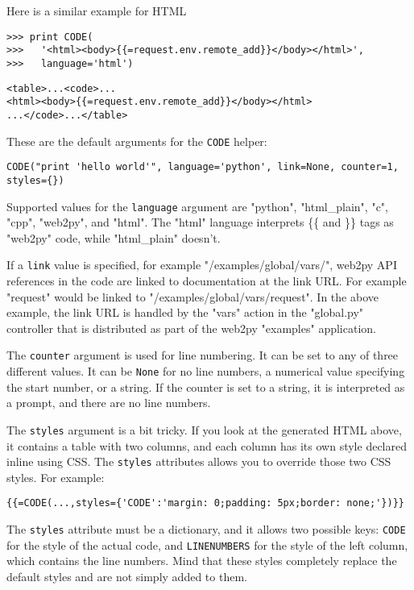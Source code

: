 \documentclass[justified,sixbynine,notoc]{tufte-book}
\def\ft{\small\tt}
\begin{document}
\begin{fullwidth}
Here is a similar example for HTML
\begin{lstlisting}
>>> print CODE(
>>>   '<html><body>{{=request.env.remote_add}}</body></html>',
>>>   language='html')
\end{lstlisting}
\begin{lstlisting}[keywords={}]
<table>...<code>...
<html><body>{{=request.env.remote_add}}</body></html>
...</code>...</table>
\end{lstlisting}

These are the default arguments for the {\ft CODE} helper:
\begin{lstlisting}
CODE("print 'hello world'", language='python', link=None, counter=1, styles={})
\end{lstlisting}

Supported values for the {\ft language} argument are "python", "html\_plain", "c", "cpp", "web2py", and "html". The "html" language interprets \{\{ and \}\} tags as "web2py" code, while "html\_plain" doesn't.

If a {\ft link} value is specified, for example "/examples/global/vars/", web2py API references in the code are linked to documentation at the link URL. For example "request" would be linked to "/examples/global/vars/request". In the above example, the link URL is handled by the "vars" action in the "global.py" controller that is distributed as part of the web2py "examples" application.

The {\ft counter} argument is used for line numbering. It can be set to any of three different values. It can be {\ft None} for no line numbers, a numerical value specifying the start number, or a string. If the counter is set to a string, it is interpreted as a prompt, and there are no line numbers.

The {\ft styles} argument is a bit tricky. If you look at the generated HTML above, it contains a table with two columns, and each column has its own style declared inline using CSS. The {\ft styles} attributes allows you to override those two CSS styles. For example:

\begin{lstlisting}[keywords={}]
{{=CODE(...,styles={'CODE':'margin: 0;padding: 5px;border: none;'})}}
\end{lstlisting}

The {\ft styles} attribute must be a dictionary, and it allows two possible keys: {\ft CODE} for the style of the actual code, and {\ft LINENUMBERS} for the style of the left column, which contains the line numbers. Mind that these styles completely replace the default styles and are not simply added to them.


\end{fullwidth}
\end{document}
